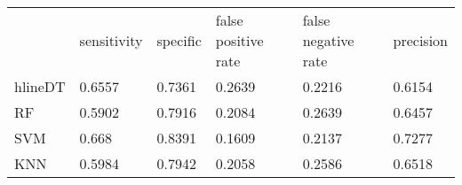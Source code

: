 \begin{table}[!h]
\begin{tabular}{l | l | l| l| l | l}
 & sensitivity & specific & false positive rate & false negative rate & precision \\hlineDT & 0.6557 & 0.7361 & 0.2639 & 0.2216 & 0.6154\\
RF & 0.5902 & 0.7916 & 0.2084 & 0.2639 & 0.6457\\
SVM & 0.668 & 0.8391 & 0.1609 & 0.2137 & 0.7277\\
KNN & 0.5984 & 0.7942 & 0.2058 & 0.2586 & 0.6518\\
\end{tabular}
\caption{}
\end{table}

